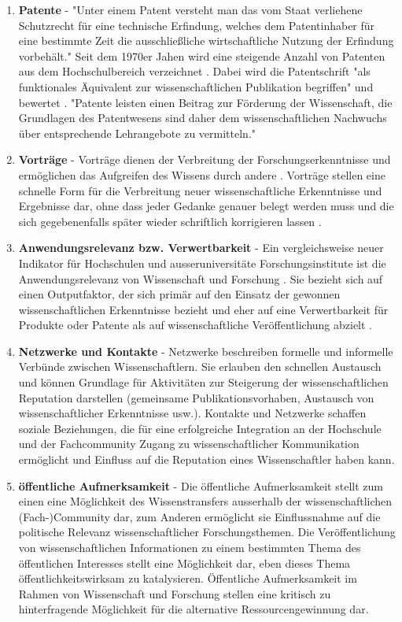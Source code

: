 \begin{enumerate}
\item \textbf{Patente} - "Unter einem Patent versteht man das vom Staat verliehene Schutzrecht für eine technische Erfindung, welches dem Patentinhaber für eine bestimmte Zeit die ausschließliche wirtschaftliche Nutzung der Erfindung vorbehält." \cite{greif_2003_patente} Seit dem 1970er Jahen wird eine steigende Anzahl von Patenten aus dem Hochschulbereich verzeichnet \cite{schmoch_2003_hochschulforschung}. Dabei wird die Patentschrift "als funktionales Äquivalent zur wissenschaftlichen Publikation begriffen" und bewertet \cite{mersch_2014_patente}. "Patente leisten einen Beitrag zur Förderung der Wissenschaft, die Grundlagen des Patentwesens sind daher dem wissenschaftlichen Nachwuchs über entsprechende Lehrangebote zu vermitteln." \cite{suchen}
\item \textbf{Vorträge} - Vorträge dienen der Verbreitung der Forschungserkenntnisse und ermöglichen das Aufgreifen des Wissens durch andere \cite{rassenhoevel_2010_performancemessung}. Vorträge stellen eine schnelle Form für die Verbreitung neuer wissenschaftliche Erkenntnisse und Ergebnisse dar, ohne dass jeder Gedanke genauer belegt werden muss und die sich gegebenenfalls später wieder schriftlich korrigieren lassen \cite{haberle_2002_jahrbuch}. 
\item\textbf{Anwendungsrelevanz bzw. Verwertbarkeit} - Ein vergleichsweise neuer Indikator für Hochschulen und ausseruniversitäte Forschungsinstitute ist die Anwendungsrelevanz von Wissenschaft und Forschung \cite{simon_2009_wissenschaft_governance}. Sie bezieht sich auf einen Outputfaktor, der sich primär auf den Einsatz der gewonnen wissenschaftlichen Erkenntnisse bezieht und eher auf eine Verwertbarkeit für Produkte oder Patente als auf wissenschaftliche Veröffentlichung abzielt \cite{suchen}.
\item \textbf{Netzwerke und Kontakte} - Netzwerke beschreiben formelle und informelle Verbünde zwischen Wissenschaftlern. Sie erlauben den schnellen Austausch und können Grundlage für Aktivitäten zur Steigerung der wissenschaftlichen Reputation darstellen (gemeinsame Publikationsvorhaben, Austausch von wissenschaftlicher Erkenntnisse usw.). Kontakte und Netzwerke schaffen soziale Beziehungen, die für eine erfolgreiche Integration an der Hochschule und der Fachcommunity Zugang zu wissenschaftlicher Kommunikation ermöglicht und Einfluss auf die Reputation eines Wissenschaftler haben kann.
\item \textbf{öffentliche Aufmerksamkeit} - Die öffentliche Aufmerksamkeit stellt zum einen eine Möglichkeit des Wissenstransfers ausserhalb der wissenschaftlichen (Fach-)Community dar, zum Anderen ermöglicht sie Einflussnahme auf die politische Relevanz wissenschaftlicher Forschungsthemen. Die Veröffentlichung von wissenschaftlichen Informationen zu einem bestimmten Thema des öffentlichen Interesses stellt eine Möglichkeit dar, eben dieses Thema öffentlichkeitswirksam zu katalysieren. Öffentliche Aufmerksamkeit im Rahmen von Wissenschaft und Forschung stellen eine kritisch zu hinterfragende Möglichkeit für die alternative Ressourcengewinnung dar. \cite{suche}

\end{enumerate}

